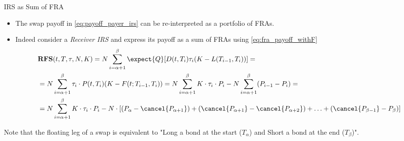 \documentclass{beamer}
\begin{document}
\begin{frame}{IRS as Sum of FRA}
	\begin{itemize}
		\item The swap payoff in \cref{eq:payoff_payer_irs} can be re-interpreted as a portfolio of FRAs.
		\item Indeed consider a \emph{Receiver IRS} and express its payoff as a sum of FRAs using \cref{eq:fra_payoff_withF}
		\begin{equation*}
			\begin{aligned}
				&\textbf{RFS}(t,T,\tau,N,K) = N\sum_{i=\alpha+1}^{\beta}\expect{Q}[D(t,T_i)\tau_i(K - L(T_{i-1},T_i))]=\\
				&=N\sum_{i=\alpha+1}^{\beta}\tau_i\cdot P(t,T_i)(K-F(t;T_{i-1},T_i))=
				N\sum_{i=\alpha+1}^{\beta}K\cdot \tau_i\cdot P_i-N\sum_{i=\alpha+1}^{\beta}(P_{i-1}-P_i)=\\
				&=N\sum_{i=\alpha+1}^{\beta}K\cdot\tau_i\cdot P_i-N\cdot[(P_\alpha -\cancel{P_{\alpha+1}}) + (\cancel{P_{\alpha+1}} - \cancel{P_{\alpha+2}}) + \ldots + (\cancel{P_{\beta-1}} - P_{\beta})] \\
			\end{aligned}
		\end{equation*}
	\end{itemize}

	\begin{tcolorbox}[colback=gray!5, colframe=maincolor, arc=0mm, boxrule=0.5pt]
	\footnotesize
	Note that the floating leg of a swap is equivalent to "Long a bond at the start ($T_\alpha$) and Short a bond at the end ($T_\beta$)".
	\end{tcolorbox}
\end{frame}
\end{document}
